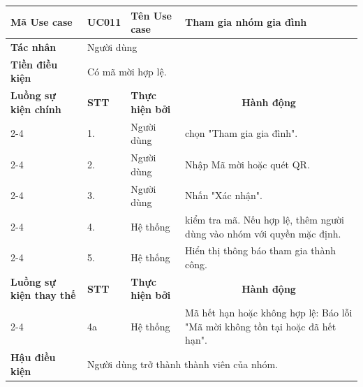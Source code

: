 \documentclass[../main.tex]{subfiles}
\begin{document}
\begin{longtable}{|p{2.7cm}|p{0.8cm}|p{2.6cm}|p{7.3cm}|}
\hline
\cellcolor[HTML]{D5F5E3}\textbf{Mã Use case} & \multicolumn{1}{l|}{UC011} & \cellcolor[HTML]{D5F5E3}\textbf{Tên Use case} & Tham gia nhóm gia đình \\ \hline
\cellcolor[HTML]{D5F5E3}\textbf{Tác nhân} & \multicolumn{3}{p{10.7cm}|}{Người dùng} \\ \hline
\cellcolor[HTML]{D5F5E3}\textbf{Tiền điều kiện} & \multicolumn{3}{p{10.7cm}|}{Có mã mời hợp lệ.} \\ \hline

\cellcolor[HTML]{D5F5E3}\textbf{Luồng sự kiện chính} & \cellcolor[HTML]{FDEBD0}\textbf{STT} & \cellcolor[HTML]{FDEBD0}\textbf{Thực hiện bởi} & \multicolumn{1}{c|}{\cellcolor[HTML]{FDEBD0}\textbf{Hành động}} \\ \cline{2-4} 
\cellcolor[HTML]{D5F5E3} & 1. & Người dùng & chọn "Tham gia gia đình". \\ \cline{2-4} 
\cellcolor[HTML]{D5F5E3} & 2. & Người dùng & Nhập Mã mời hoặc quét QR. \\ \cline{2-4} 
\cellcolor[HTML]{D5F5E3} & 3. & Người dùng & Nhấn "Xác nhận". \\ \cline{2-4} 
\cellcolor[HTML]{D5F5E3} & 4. & Hệ thống & kiểm tra mã. Nếu hợp lệ, thêm người dùng vào nhóm với quyền mặc định. \\ \cline{2-4} 
\cellcolor[HTML]{D5F5E3} & 5. & Hệ thống & Hiển thị thông báo tham gia thành công. \\ \hline

\cellcolor[HTML]{D5F5E3}\textbf{Luồng sự kiện thay thế} & \cellcolor[HTML]{FDEBD0}\textbf{STT} & \cellcolor[HTML]{FDEBD0}\textbf{Thực hiện bởi} & \multicolumn{1}{c|}{\cellcolor[HTML]{FDEBD0}\textbf{Hành động}} \\ \cline{2-4} 
\cellcolor[HTML]{D5F5E3} & 4a & Hệ thống & Mã hết hạn hoặc không hợp lệ: Báo lỗi "Mã mời không tồn tại hoặc đã hết hạn". \\ \hline

\cellcolor[HTML]{D5F5E3}\textbf{Hậu điều kiện} & \multicolumn{3}{p{10.7cm}|}{Người dùng trở thành thành viên của nhóm.} \\ \hline
\end{longtable}
\endgroup
\end{document}
